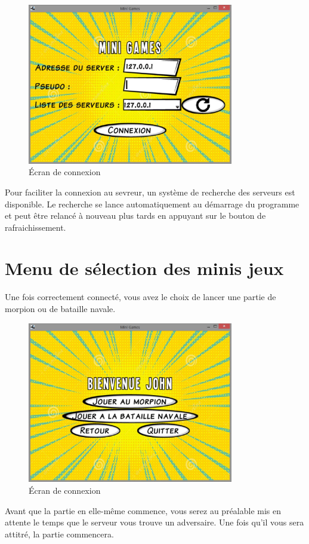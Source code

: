 \documentclass{report}
\begin{document}
\begin{figure}[H]
	\centering\includegraphics[width=9cm]{loginScreen}
	\caption{Écran de connexion}
\end{figure}

Pour faciliter la connexion au sevreur, un système de recherche des serveurs est disponible. Le recherche se lance
automatiquement au démarrage du programme et peut être relancé à nouveau plus tards en appuyant sur le bouton de rafraichissement.


\chapter{Menu de sélection des minis jeux}
Une fois correctement connecté, vous avez le choix de lancer une partie de morpion ou de bataille navale.
\begin{figure}[H]
	\centering\includegraphics[width=9cm]{MenuJeux}
	\caption{Écran de connexion}
\end{figure}

Avant que la partie en elle-même commence, vous serez au préalable mis en attente le temps que le serveur vous trouve un adversaire. Une fois qu'il vous sera attitré, la partie commencera.
\end{document}
